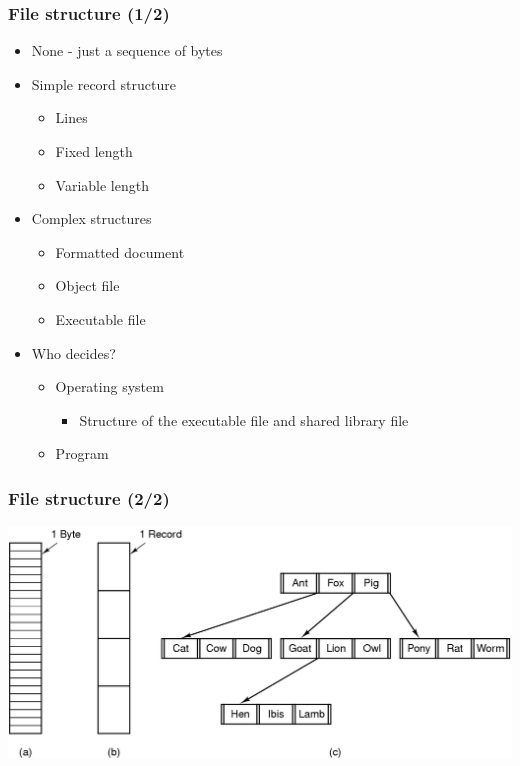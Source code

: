 \documentclass[CJKutf8,xcolor=pdftex,dvipsnames,table]{beamer}
\begin{document}
\begin{CJK*}{UTF8}{song}
  \begin{frame}
    \frametitle{File structure (1/2)} \pause
    \begin{itemize}\parskip=0pt
    \item None - just a sequence of bytes \pause
    \item Simple record structure \pause
      \begin{itemize}\parskip=0pt
      \item Lines \pause
      \item Fixed length \pause
      \item Variable length \pause
      \end{itemize}
    \item Complex structures
      \begin{itemize}\parskip=0pt
      \item Formatted document \pause
      \item Object file \pause
      \item Executable file \pause
      \end{itemize}
    \item Who decides? \pause
      \begin{itemize}\parskip=0pt
      \item Operating system \pause
        \begin{itemize}\parskip=0pt
        \item Structure of the executable file and shared library file \pause
        \end{itemize}
      \item Program
      \end{itemize}
    \end{itemize}
  \end{frame}

  \begin{frame}
    \frametitle{File structure (2/2)} \pause
    \begin{center}
      \includegraphics[scale=0.2]{mosv2f6-2}
    \end{center}
  \end{frame}


\end{CJK*}
\end{document}
